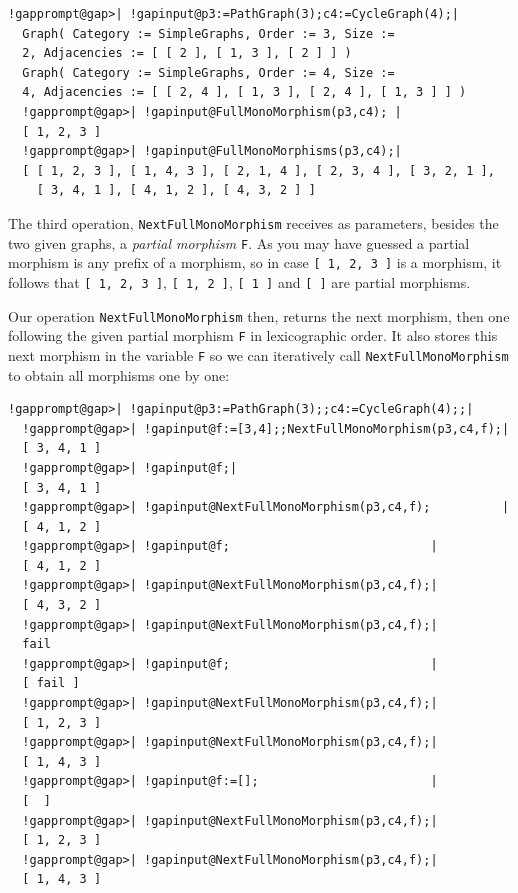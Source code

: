 \documentclass[a4paper,11pt]{report}
\begin{document}
{{ 
\begin{Verbatim}[commandchars=!@|,fontsize=\small,frame=single,label=Example]
  !gapprompt@gap>| !gapinput@p3:=PathGraph(3);c4:=CycleGraph(4);|
  Graph( Category := SimpleGraphs, Order := 3, Size := 
  2, Adjacencies := [ [ 2 ], [ 1, 3 ], [ 2 ] ] )
  Graph( Category := SimpleGraphs, Order := 4, Size := 
  4, Adjacencies := [ [ 2, 4 ], [ 1, 3 ], [ 2, 4 ], [ 1, 3 ] ] )
  !gapprompt@gap>| !gapinput@FullMonoMorphism(p3,c4); |
  [ 1, 2, 3 ]
  !gapprompt@gap>| !gapinput@FullMonoMorphisms(p3,c4);|
  [ [ 1, 2, 3 ], [ 1, 4, 3 ], [ 2, 1, 4 ], [ 2, 3, 4 ], [ 3, 2, 1 ], 
    [ 3, 4, 1 ], [ 4, 1, 2 ], [ 4, 3, 2 ] ]
\end{Verbatim}
 

The third operation, \texttt{NextFullMonoMorphism} receives as parameters, besides the two given graphs, a \emph{partial morphism} \texttt{F}. As you may have guessed a partial morphism is any prefix of a morphism, so
in case \texttt{[ 1, 2, 3 ]} is a morphism, it follows that \texttt{[ 1, 2, 3 ]}, \texttt{[ 1, 2 ]}, \texttt{[ 1 ]} and \texttt{[ ]} are partial morphisms. 

Our operation \texttt{NextFullMonoMorphism} then, returns the next morphism, then one following the given partial morphism \texttt{F} in lexicographic order. It also stores this next morphism in the variable \texttt{F} so we can iteratively call \texttt{NextFullMonoMorphism} to obtain all morphisms one by one: 

 
\begin{Verbatim}[commandchars=!@|,fontsize=\small,frame=single,label=Example]
  !gapprompt@gap>| !gapinput@p3:=PathGraph(3);;c4:=CycleGraph(4);;|
  !gapprompt@gap>| !gapinput@f:=[3,4];;NextFullMonoMorphism(p3,c4,f);|
  [ 3, 4, 1 ]
  !gapprompt@gap>| !gapinput@f;|
  [ 3, 4, 1 ]
  !gapprompt@gap>| !gapinput@NextFullMonoMorphism(p3,c4,f);          |
  [ 4, 1, 2 ]
  !gapprompt@gap>| !gapinput@f;                            |
  [ 4, 1, 2 ]
  !gapprompt@gap>| !gapinput@NextFullMonoMorphism(p3,c4,f);|
  [ 4, 3, 2 ]
  !gapprompt@gap>| !gapinput@NextFullMonoMorphism(p3,c4,f);|
  fail
  !gapprompt@gap>| !gapinput@f;                            |
  [ fail ]
  !gapprompt@gap>| !gapinput@NextFullMonoMorphism(p3,c4,f);|
  [ 1, 2, 3 ]
  !gapprompt@gap>| !gapinput@NextFullMonoMorphism(p3,c4,f);|
  [ 1, 4, 3 ]
  !gapprompt@gap>| !gapinput@f:=[];                        |
  [  ]
  !gapprompt@gap>| !gapinput@NextFullMonoMorphism(p3,c4,f);|
  [ 1, 2, 3 ]
  !gapprompt@gap>| !gapinput@NextFullMonoMorphism(p3,c4,f);|
  [ 1, 4, 3 ]
\end{Verbatim}
 

}}
\end{document}
